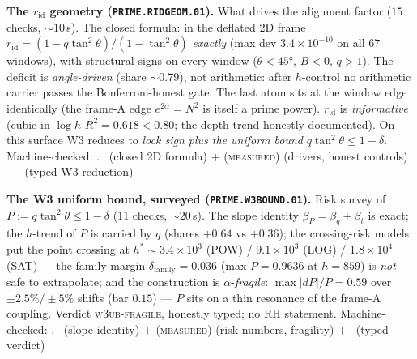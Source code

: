 \par\smallskip\noindent\textbf{The $r_{\mathrm{id}}$ geometry
(\texttt{PRIME.RIDGEOM.01}).}
What drives the alignment factor ($15$ checks, ${\sim}10$\,s).  The
closed formula: in the deflated 2D frame
$r_{\mathrm{id}}=(1-q\tan^2\theta)/(1-\tan^2\theta)$ \emph{exactly}
(max dev $3.4\times10^{-10}$ on all $67$ windows), with structural
signs on every window ($\theta<45°$, $B<0$, $q>1$).  The deficit is
\emph{angle-driven} (share ${\sim}0.79$), not arithmetic: after
$h$-control no arithmetic carrier passes the Bonferroni-honest gate.
The last atom sits at the window edge identically (the frame-A edge
$e^{2\alpha}=N^2$ is itself a prime power).  $r_{\mathrm{id}}$ is
\emph{informative} (cubic-in-$\log h$ $R^2=0.618<0.80$; the depth
trend honestly documented).  On this surface W3 reduces to
\emph{lock sign plus the uniform bound} $q\tan^2\theta\le1-\delta$.
Machine-checked: .
\mE\ (closed 2D formula) $+$ (\textsc{measured}) (drivers, honest
controls) $+$ \mC\ (typed W3 reduction)
\par\smallskip


\par\smallskip\noindent\textbf{The W3 uniform bound, surveyed
(\texttt{PRIME.W3BOUND.01}).}
Risk survey of $P:=q\tan^2\theta\le1-\delta$ ($11$ checks,
${\sim}20$\,s).  The slope identity $\beta_P=\beta_q+\beta_t$ is
exact; the $h$-trend of $P$ is carried by $q$ (shares $+0.64$ vs
$+0.36$); the crossing-risk models put the point crossing at
$h^*\sim3.4\times10^3$ (POW) / $9.1\times10^3$ (LOG) /
$1.8\times10^4$ (SAT) --- the family margin
$\delta_{\mathrm{family}}=0.036$ (max $P=0.9636$ at $h=859$) is
\emph{not} safe to extrapolate; and the construction is
$\alpha$-\emph{fragile}: $\max|dP|/P=0.59$ over
$\pm2.5\%/\pm5\%$ shifts (bar $0.15$) --- $P$ sits on a thin
resonance of the frame-A coupling.  Verdict
\textsc{w3ub-fragile}, honestly typed; no RH statement.
Machine-checked: .
\mE\ (slope identity) $+$ (\textsc{measured}) (risk numbers,
fragility) $+$ \mC\ (typed verdict)
\par\smallskip


